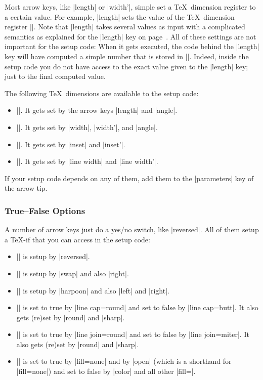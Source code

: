 Most arrow keys, like |length| or |width'|, simple set a \TeX\ dimension
register to a certain value. For example, |length| sets the value of the \TeX\
dimension register |\pgfarrowlength|. Note that |length| takes several values
as input with a complicated semantics as explained for the |length| key on
page~\pageref{length-arrow-key}. All of these settings are not important for
the setup code: When it gets executed, the code behind the |length| key will
have computed a simple number that is stored in |\pgfarrowlength|. Indeed,
inside the setup code you do not have access to the exact value given to the
|length| key; just to the final computed value.

The following \TeX\ dimensions are available to the setup code:
%
\begin{itemize}
    \item |\pgfarrowslength|. It gets set by the arrow keys |length| and
        |angle|.
    \item |\pgfarrowswidth|. It gets set by |width|, |width'|, and |angle|.
    \item |\pgfarrowsinset|. It gets set by |inset| and |inset'|.
    \item |\pgfarrowslinewidth|. It gets set by |line width| and |line width'|.
\end{itemize}

If your setup code depends on any of them, add them to the |parameters| key of
the arrow tip.


\subsubsection{True--False Options}

A number of arrow keys just do a yes/no switch, like |reversed|. All of them
setup a \TeX-if that you can access in the setup code:
%
\begin{itemize}
    \item |\ifpgfarrowreversed| is setup by |reversed|.
    \item |\ifpgfarrowswap| is setup by |swap| and also |right|.
    \item |\ifpgfarrowharpoon| is setup by |harpoon| and also |left| and
        |right|.
    \item |\ifpgfarrowroundcap| is set to true by |line cap=round| and set to
        false by |line cap=butt|. It also gets (re)set by  |round| and |sharp|.
    \item |\ifpgfarrowroundjoin| is set to true by |line join=round| and set to
        false by |line join=miter|. It also gets (re)set by  |round| and
        |sharp|.
    \item |\ifpgfarrowopen| is set to true by |fill=none| and by |open| (which
        is a shorthand for |fill=none|) and set to false by |color| and all
        other |fill=|\meta{color}.
\end{itemize}

